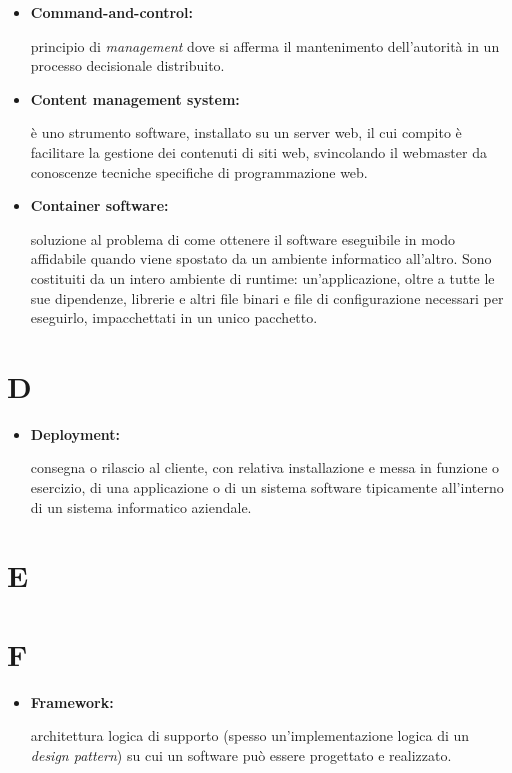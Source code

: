 \begin{itemize}
	\item \hypertarget{cac}{\textbf{Command-and-control:}} principio di \textit{management} dove si afferma il mantenimento dell'autorità in un processo decisionale distribuito.
	
	\item \hypertarget{cms}{\textbf{Content management system:}}  è uno strumento software, installato su un server web, il cui compito è facilitare la gestione dei contenuti di siti web, svincolando il webmaster da conoscenze tecniche specifiche di programmazione web.
	
	\item \hypertarget{cs}{\textbf{Container software:}}  soluzione al problema di come ottenere il software eseguibile in modo affidabile quando viene spostato da un ambiente informatico all'altro. Sono costituiti da un intero ambiente di runtime: un'applicazione, oltre a tutte le sue dipendenze, librerie e altri file binari e file di configurazione necessari per eseguirlo, impacchettati in un unico pacchetto.
	 
\end{itemize}

\section*{D}

\begin{itemize}
	\item \hypertarget{dep}{\textbf{Deployment:}} consegna o rilascio al cliente, con relativa installazione e messa in funzione o esercizio, di una applicazione o di un sistema software tipicamente all'interno di un sistema informatico aziendale.
\end{itemize}

\section*{E}

\section*{F}

\begin{itemize}
	\item \hypertarget{fw}{\textbf{Framework:}} architettura logica di supporto (spesso un'implementazione logica di un \textit{design pattern}) su cui un software può essere progettato e realizzato.
\end{itemize}

